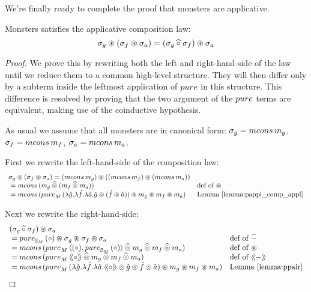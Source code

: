 We're finally ready to complete the proof that monsters are applicative.
\begin{lemma}
Monsters satisfies the applicative composition law:
$$
\sigma_g \circledast (\sigma_f \circledast \sigma_a)
 = 
(\sigma_g \mathbin{\widehat{\circ}} \sigma_f) \circledast \sigma_a
$$
\end{lemma}
\begin{proof}
We prove this by rewriting both the left and right-hand-side of the law
until we reduce them to a common high-level structure.
They will then differ only by a subterm inside the leftmost application of $\apure$ in this structure.
This difference is resolved by proving that the two argument of the $\apure$ terms are equivalent, making use of the coinductive hypothesis.

As usual we assume that all monsters are in canonical form: $\sigma_g = \mcons\,m_g$, $\sigma_f = \mcons\,m_f$, $\sigma_a = \mcons\,m_a$.

First we rewrite the left-hand-side of the composition law:
$$
\begin{array}{ll}
\sigma_g \appl (\sigma_f \appl \sigma_a)
 = (\mcons\,m_g) \appl ((\mcons\,m_f) \appl (\mcons\,m_a))\\
{}= \mcons\,(m_g \alift{\pappl} (m_f \alift{\pappl} m_a))
  &  \mbox{def of }\appl \\
{}= \mcons\,(
\apure_M\, (\lambda \pstr{g}. \lambda \pstr{f}. \lambda \pstr{a}. \pstr{g} \pappl (\pstr{f}\pappl \pstr{a})) \appl m_g \appl m_f \appl m_a
)
  & \mbox{Lemma \ref{lemma:pappl_comp_appl}}
\end{array}
$$

Next we rewrite the right-hand-side:
$$
\begin{array}{ll}
(\sigma_g \alift{\comp} \sigma_f) \appl \sigma_a\\
{}= \apure_{\stream{M}}\,(\comp) \appl \sigma_g \appl \sigma_f \appl \sigma_a
  & \mbox{def of }\alift{-}\\
{}= \mcons\, (\apure_M\,\pair{(\comp)}{\apure_{\stream{M}}\,(\comp)} \alift{\pappl} m_g \alift{\pappl} m_f \alift{\pappl} m_a)
  & \mbox{def of }\appl\\
{}= \mcons\, (\apure_M\,\ppair{\comp} \alift{\pappl} m_g \alift{\pappl} m_f \alift{\pappl} m_a)
  & \mbox{def of }\ppair{-}\\
{}= \mcons\,(
\apure_M\,(\lambda \pstr{g}. \lambda \pstr{f}. \lambda \pstr{a}. \ppair{\comp} \pappl \pstr{g}  \pappl \pstr{f}  \pappl \pstr{a}) \appl m_g \appl m_f \appl m_a)
  & \mbox{Lemma \ref{lemma:ppair}}
\end{array}
$$


\end{proof}
